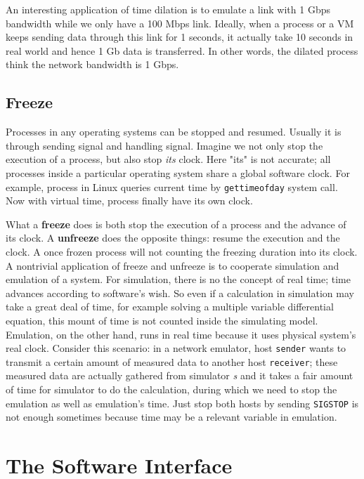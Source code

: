 \documentclass{acm_proc_article-sp}
\begin{document}
An interesting application of time dilation is to emulate a link with 1 Gbps bandwidth while we only have a 100 Mbps link. Ideally, when a process or a VM keeps sending data through this link for 1 seconds, it actually take 10 seconds in real world and hence 1 Gb data is transferred. In other words, the dilated process think the network bandwidth is 1 Gbps.

\subsection{Freeze}
Processes in any operating systems can be stopped and resumed. Usually it is through sending signal and handling signal. Imagine we not only stop the execution of a process, but also stop \textit{its} clock. Here "its" is not accurate; all processes inside a particular operating system share a global software clock. For example, process in Linux queries current time by \texttt{gettimeofday} system call. Now with virtual time, process finally have its own clock.

What a \textbf{freeze} does is both stop the execution of a process and the advance of its clock. A \textbf{unfreeze} does the opposite things: resume the execution and the clock. A once frozen process will not counting the freezing duration into its clock. A nontrivial application of freeze and unfreeze is to cooperate simulation and emulation of a system. For simulation, there is no the concept of real time; time advances according to software's wish. So even if a calculation in simulation may take a great deal of time, for example solving a multiple variable differential equation, this mount of time is not counted inside the simulating model. Emulation, on the other hand, runs in real time because it uses physical system's real clock. Consider this scenario: in a network emulator, host \texttt{sender} wants to transmit a certain amount of measured data to another host \texttt{receiver}; these measured data are actually gathered from simulator \textit{s} and it takes a fair amount of time for simulator to do the calculation, during which we need to stop the emulation as well as emulation's time. Just stop both hosts by sending \texttt{SIGSTOP} is not enough sometimes because time may be a relevant variable in emulation.

\section{The Software Interface}
\end{document}
